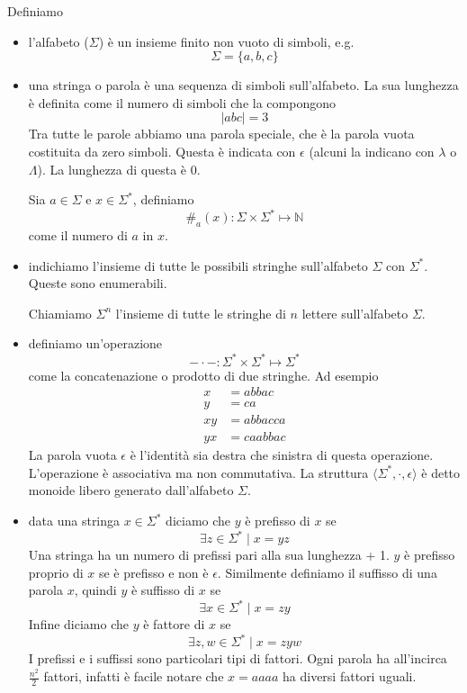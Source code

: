 \documentclass[12pt]{report}
\begin{document}
Definiamo
\begin{itemize}
	\item l'alfabeto ($\Sigma$) è un insieme finito non vuoto di simboli, e.g. 
		$$ \Sigma = \{ a , b , c \} $$
	\item una stringa o parola è una sequenza di simboli sull'alfabeto.
		La sua lunghezza è definita come il numero di simboli che la compongono
		$$ | abc | = 3 $$
		Tra tutte le parole abbiamo una parola speciale, che è la parola vuota costituita da zero simboli.
		Questa è indicata con $\epsilon$ (alcuni la indicano con $\lambda$ o $\Lambda$).
		La lunghezza di questa è 0.

		Sia $a \in \Sigma$ e $x \in \Sigma^*$, definiamo 
		$$ \#_a(x) : \Sigma \times \Sigma^* \mapsto \mathbb{N} $$
		come il numero di $a$ in $x$.
	\item indichiamo l'insieme di tutte le possibili stringhe sull'alfabeto $\Sigma$ con $\Sigma^*$.
		Queste sono enumerabili.

		Chiamiamo $\Sigma^n$ l'insieme di tutte le stringhe di $n$ lettere sull'alfabeto $\Sigma$.
	\item definiamo un'operazione 
		$$ - \cdot - : \Sigma^* \times \Sigma^* \mapsto \Sigma^*$$
		come la concatenazione o prodotto di due stringhe.
		Ad esempio
		\begin{align*}
			x &= abbac \\
			y &= ca \\
			xy &= abbacca \\
			yx &= caabbac
		\end{align*}
		La parola vuota $\epsilon$ è l'identità sia destra che sinistra di questa operazione.
		L'operazione è associativa ma non commutativa.
		La struttura $\langle \Sigma^*, \cdot, \epsilon \rangle$ è detto monoide libero generato dall'alfabeto $\Sigma$.
	\item data una stringa $x \in \Sigma^*$ diciamo che $y$ è prefisso di $x$ se
		$$ \exists z \in \Sigma^* \mid x = yz $$
		Una stringa ha un numero di prefissi pari alla sua lunghezza + 1.
		$y$ è prefisso proprio di $x$ se è prefisso e non è $\epsilon$.
		Similmente definiamo il suffisso di una parola $x$, quindi $y$ è suffisso di $x$ se 
		$$ \exists x \in \Sigma^* \mid x = zy $$
		Infine diciamo che $y$ è fattore di $x$ se
		$$ \exists z, w \in \Sigma^* \mid x = zyw $$
		I prefissi e i suffissi sono particolari tipi di fattori.
		Ogni parola ha all'incirca $\frac{n^2}{2}$ fattori, infatti è facile notare che $x = aaaa$ ha diversi fattori uguali.


\end{itemize}
\end{document}

